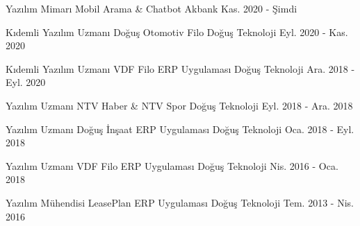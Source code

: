 

\begin{cventries}

  \cventry
    {Yazılım Mimarı} %
    {Mobil Arama \& Chatbot} %
    {Akbank} %
    {Kas. 2020 - Şimdi} %
    {}

  \cventry
    {Kıdemli Yazılım Uzmanı} %
    {Doğuş Otomotiv Filo} %
    {Doğuş Teknoloji} %
    {Eyl. 2020 - Kas. 2020} %
    {}

  \cventry
    {Kıdemli Yazılım Uzmanı} %
    {VDF Filo ERP Uygulaması} %
    {Doğuş Teknoloji} %
    {Ara. 2018 - Eyl. 2020} %
    {}

  \cventry
    {Yazılım Uzmanı} %
    {NTV Haber \& NTV Spor} %
    {Doğuş Teknoloji} %
    {Eyl. 2018 - Ara. 2018} %
    {}

  \cventry
    {Yazılım Uzmanı} %
    {Doğuş İnşaat ERP Uygulaması} %
    {Doğuş Teknoloji} %
    {Oca. 2018 - Eyl. 2018} %
    {}

  \cventry
    {Yazılım Uzmanı} %
    {VDF Filo ERP Uygulaması} %
    {Doğuş Teknoloji} %
    {Nis. 2016 - Oca. 2018} %
    {}

  \cventry
    {Yazılım Mühendisi} %
    {LeasePlan ERP Uygulaması} %
    {Doğuş Teknoloji} %
    {Tem. 2013 - Nis. 2016} %
    {}

\end{cventries}
